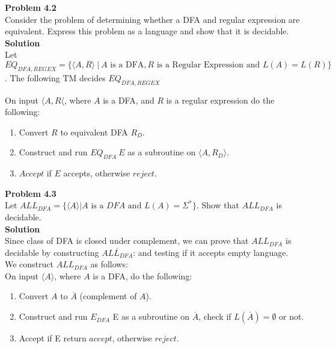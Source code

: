 \documentclass{article}
\newcommand\curl[1]{\{#1\}}
\newcommand{\problem}[1]{\large{\textbf{Problem #1}}\\}
\begin{document}
\problem{4.2}

    Consider the problem of determining whether a DFA and regular expression are equivalent. Express this problem as a language and show that it is decidable. \\

\textbf{Solution}\\
    
    Let $EQ_{DFA,REGEX} = \curl{\langle A, R \rangle \ |\  A \text{ is a  DFA}, R \text{ is a Regular Expression and } L(A) = L(R)} $. The following TM 
    decides $EQ_{DFA,REGEX}$
    
    On input $ \langle A,R \langle $, where $A$ is a DFA, and $R$ is a regular expression do the following:
    \begin{enumerate}[1., leftmargin = 1.5cm]
    \itemsep0em
    \item Convert $R$ to equivalent DFA $R_{D}$.
    \item Construct and run $EQ_{DFA}\ E$  as a subroutine on $\langle A, R_{D} \rangle$.
    \item $Accept$ if $E$ accepts, otherwise $reject$.
    \end{enumerate}

\pagebreak

\problem{4.3}

    Let $ALL_{DFA} = \curl{\langle A \rangle | A \text{ is a } DFA \text{ and } L(A) = \Sigma^*} $. Show that $ALL_{DFA}$ is decidable.\\
    
    \textbf{Solution}\\

    Since class of DFA is closed under complement, we can prove that $ALL_{DFA}$ is decidable by constructing $\overline{ALL_{DFA}}$: 
    and testing if it accepts empty language.\\

    We construct $ALL_{DFA}$ as follows:\\
    On input $ \langle A \rangle $, where $A$ is a DFA, do the following:
    \begin{enumerate}[1., leftmargin = 1.5cm]
    \itemsep0em
    \item Convert $A$ to $\overline{A}$ (complement of $A$).
    \item Construct and run $E_{DFA}$ E as a subroutine on $\overline{A}$, check if $L(\overline{A}) = \emptyset $ or not.
    \item Accept if E return $accept$, otherwise $reject$.\\
    \end{enumerate}
\end{document}
